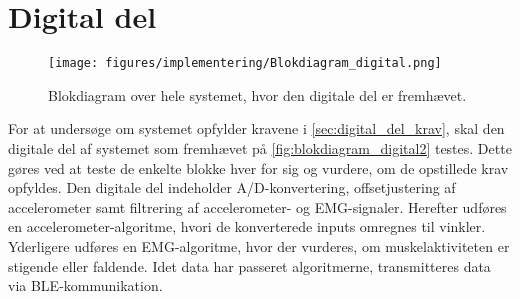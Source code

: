 \section{Digital del}
\begin{figure}[H]
\centering
\texttt{[image: figures/implementering/Blokdiagram\_digital.png]}
\caption{Blokdiagram over hele systemet, hvor den digitale del er fremhævet.}
\label{fig:blokdiagram_digital2}
\end{figure}

For at undersøge om systemet opfylder kravene i \autoref{sec:digital_del_krav}, skal den digitale del af systemet som fremhævet på \autoref{fig:blokdiagram_digital2} testes. 
Dette gøres ved at teste de enkelte blokke hver for sig og vurdere, om de opstillede krav opfyldes. 
Den digitale del indeholder A/D-konvertering, offsetjustering af accelerometer samt filtrering af accelerometer- og EMG-signaler. 
Herefter udføres en accelerometer-algoritme, hvori de konverterede inputs omregnes til vinkler. 
Yderligere udføres en EMG-algoritme, hvor der vurderes, om muskelaktiviteten er stigende eller faldende. 
Idet data har passeret algoritmerne, transmitteres data via BLE-kommunikation.